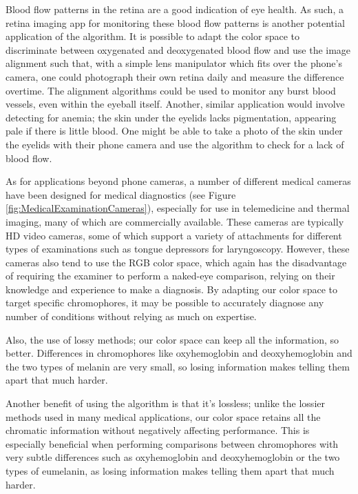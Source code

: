Blood flow patterns in the retina are a good indication of eye health. As such, a retina imaging app for monitoring these blood flow patterns is another potential application of the algorithm. It is possible to adapt the color space to discriminate between oxygenated and deoxygenated blood flow and use the image alignment such that, with a simple lens manipulator which fits over the phone's camera, one could photograph their own retina daily and measure the difference overtime. The alignment algorithms could be used to monitor any burst blood vessels, even within the eyeball itself. Another, similar application would involve detecting for anemia; the skin under the eyelids lacks pigmentation, appearing pale if there is little blood. One might be able to take a photo of the skin under the eyelids with their phone camera and use the algorithm to check for a lack of blood flow.

As for applications beyond phone cameras, a number of different medical cameras have been designed for medical diagnostics (see Figure \ref{fig:MedicalExaminationCameras}), especially for use in telemedicine and thermal imaging, many of which are commercially available. These cameras are typically HD video cameras, some of which support a variety of attachments for different types of examinations such as tongue depressors for laryngoscopy. However, these cameras also tend to use the RGB color space, which again has the disadvantage of requiring the examiner to perform a naked-eye comparison, relying on their knowledge and experience to make a diagnosis. By adapting our color space to target specific chromophores, it may be possible to accurately diagnose any number of conditions without relying as much on expertise. 

Also, the use of lossy methods; our color space can keep all the information, so better. Differences in chromophores like oxyhemoglobin and deoxyhemoglobin and the two types of melanin are very small, so losing information makes telling them apart that much harder.

Another benefit of using the algorithm is that it's lossless; unlike the lossier methods used in many medical applications, our color space retains all the chromatic information without negatively affecting performance. This is especially beneficial when performing comparisons between chromophores with very subtle differences such as oxyhemoglobin and deoxyhemoglobin or the two types of eumelanin, as losing information makes telling them apart that much harder.

